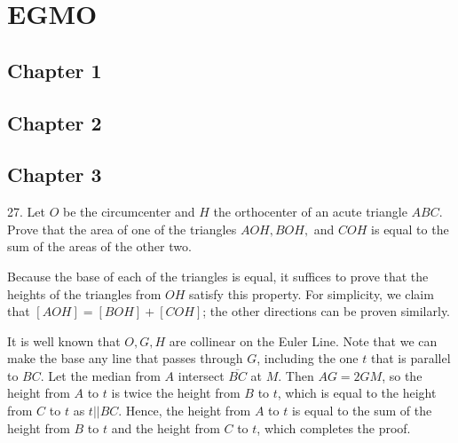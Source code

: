 \documentclass{scrartcl}
\begin{document}
\section{EGMO}
\subsection{Chapter 1}

\subsection{Chapter 2}

\subsection{Chapter 3}
\begin{problem}[APMO 2004/2]
	27. Let $O$ be the circumcenter and $H$ the orthocenter of an acute triangle $ABC$. Prove that the area of one of the triangles $AOH, BOH, $ and $COH$ is equal to the sum of the areas of the other two.
\end{problem}

\begin{solution}
	Because the base of each of the triangles is equal, it suffices to prove that the heights of the triangles from $OH$ satisfy this property. For simplicity, we claim that $[AOH] = [BOH] + [COH]$; the other directions can be proven similarly.

	It is well known that $O, G, H$ are collinear on the Euler Line. Note that we can make the base any line that passes through $G$, including the one $t$ that is parallel to $BC$. Let the median from $A$ intersect $\overline{BC}$ at $M$. Then $AG = 2GM$, so the height from $A$ to $t$ is twice the height from $B$ to $t$, which is equal to the height from $C$ to $t$ as $t || BC$. Hence, the height from $A$ to $t$ is equal to the sum of the height from $B$ to $t$ and the height from $C$ to $t$, which completes the proof.
\end{solution}
\end{document}
